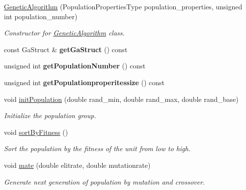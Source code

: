 \begin{DoxyCompactItemize}
\item 
\hyperlink{class_genetic_algorithm_a42ff3734cadb8b9d94af72122872b358}{Genetic\+Algorithm} (Population\+Properties\+Type population\+\_\+properties, unsigned int population\+\_\+number)
\begin{DoxyCompactList}\small\item\em Constructor for \hyperlink{class_genetic_algorithm}{Genetic\+Algorithm} class. \end{DoxyCompactList}\item 
const Ga\+Struct \& {\bfseries get\+Ga\+Struct} () const \hypertarget{class_genetic_algorithm_a8bb058aba83980d2fd30d414e45997dd}{}\label{class_genetic_algorithm_a8bb058aba83980d2fd30d414e45997dd}

\item 
unsigned int {\bfseries get\+Population\+Number} () const \hypertarget{class_genetic_algorithm_a91ce55acdb3c19f5a7047396501c691f}{}\label{class_genetic_algorithm_a91ce55acdb3c19f5a7047396501c691f}

\item 
unsigned int {\bfseries get\+Populationproperitessize} () const \hypertarget{class_genetic_algorithm_a2ea232269a4a14fd8f6a90e56258c951}{}\label{class_genetic_algorithm_a2ea232269a4a14fd8f6a90e56258c951}

\item 
void \hyperlink{class_genetic_algorithm_ae6646f697b05f35182dad2a32875c8c9}{init\+Population} (double rand\+\_\+min, double rand\+\_\+max, double rand\+\_\+base)
\begin{DoxyCompactList}\small\item\em Initialize the population group. \end{DoxyCompactList}\item 
void \hyperlink{class_genetic_algorithm_a8d74e4e771fdc7ee9d3af0f8a51cdef9}{sort\+By\+Fitness} ()\hypertarget{class_genetic_algorithm_a8d74e4e771fdc7ee9d3af0f8a51cdef9}{}\label{class_genetic_algorithm_a8d74e4e771fdc7ee9d3af0f8a51cdef9}

\begin{DoxyCompactList}\small\item\em Sort the population by the fitness of the unit from low to high. \end{DoxyCompactList}\item 
void \hyperlink{class_genetic_algorithm_a68302fdc33d694ce97b93a6d48d83181}{mate} (double elitrate, double mutationrate)
\begin{DoxyCompactList}\small\item\em Generate next generation of population by mutation and crossover. \end{DoxyCompactList}\end{DoxyCompactItemize}
